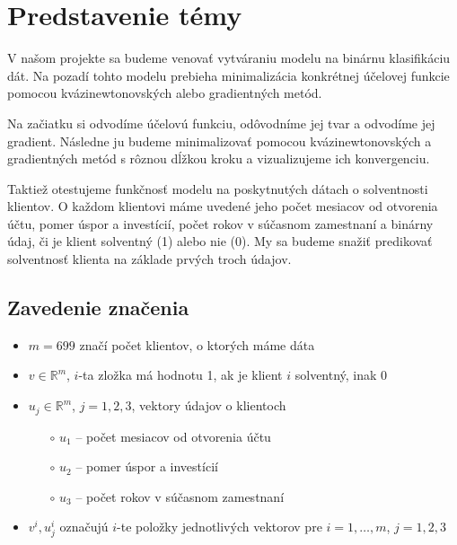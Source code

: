 \documentclass[report.tex]{subfiles}
\begin{document}
	
\section{Predstavenie témy}	

V našom projekte sa budeme venovať vytváraniu modelu na binárnu klasifikáciu dát. Na pozadí tohto modelu prebieha minimalizácia konkrétnej účelovej funkcie pomocou kvázinewtonovských alebo gradientných metód. 

Na začiatku si odvodíme účelovú funkciu, odôvodníme jej tvar a odvodíme jej gradient. Následne ju budeme minimalizovať pomocou kvázinewtonovských a gradientných metód s rôznou dĺžkou kroku a vizualizujeme ich konvergenciu. 

Taktiež otestujeme funkčnosť modelu na poskytnutých dátach o solventnosti klientov. O každom klientovi máme uvedené jeho počet mesiacov od otvorenia účtu, pomer úspor a investícií, počet rokov v súčasnom zamestnaní a binárny údaj, či je klient solventný (1) alebo nie (0). My sa budeme snažiť predikovať solventnosť klienta na základe prvých troch údajov. 

\subsection{Zavedenie značenia}

\begin{itemize}
	\item $m = 699$ značí počet klientov, o ktorých máme dáta
	\item $v \in \mathbb{R}^m$, $i$-ta zložka má hodnotu 1, ak je klient $i$ solventný, inak 0
	\item $u_j \in \mathbb{R}^m$, $j=1,2,3$, vektory údajov o klientoch
	\begin{itemize}
		\item[$\circ$] $u_1$ -- počet mesiacov od otvorenia účtu
		\item[$\circ$] $u_2$ -- pomer úspor a investícií
		\item[$\circ$] $u_3$ -- počet rokov v súčasnom zamestnaní
	\end{itemize}
	\item $v^i,u_j^i$ označujú $i$-te položky jednotlivých vektorov pre $i=1,\dots,m$, $j=1,2,3$
\end{itemize}
	
\end{document}
